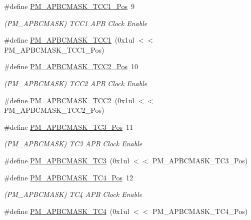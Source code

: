 \begin{DoxyCompactItemize}
\item 
\#define \mbox{\hyperlink{group___s_a_m_d21___p_m_ga7531a34e3197f854d0433f7b421681d0}{P\+M\+\_\+\+A\+P\+B\+C\+M\+A\+S\+K\+\_\+\+T\+C\+C1\+\_\+\+Pos}}~9
\begin{DoxyCompactList}\small\item\em (P\+M\+\_\+\+A\+P\+B\+C\+M\+A\+SK) T\+C\+C1 A\+PB Clock Enable \end{DoxyCompactList}\item 
\#define \mbox{\hyperlink{group___s_a_m_d21___p_m_gafb487299adc11d02aa2236c6ae39c7e8}{P\+M\+\_\+\+A\+P\+B\+C\+M\+A\+S\+K\+\_\+\+T\+C\+C1}}~(0x1ul $<$$<$ P\+M\+\_\+\+A\+P\+B\+C\+M\+A\+S\+K\+\_\+\+T\+C\+C1\+\_\+\+Pos)
\item 
\#define \mbox{\hyperlink{group___s_a_m_d21___p_m_ga6a6521e9b851e2d64fad2ad87dcf7e70}{P\+M\+\_\+\+A\+P\+B\+C\+M\+A\+S\+K\+\_\+\+T\+C\+C2\+\_\+\+Pos}}~10
\begin{DoxyCompactList}\small\item\em (P\+M\+\_\+\+A\+P\+B\+C\+M\+A\+SK) T\+C\+C2 A\+PB Clock Enable \end{DoxyCompactList}\item 
\#define \mbox{\hyperlink{group___s_a_m_d21___p_m_ga4bb882b5fec1ab879c8eade3da099ebc}{P\+M\+\_\+\+A\+P\+B\+C\+M\+A\+S\+K\+\_\+\+T\+C\+C2}}~(0x1ul $<$$<$ P\+M\+\_\+\+A\+P\+B\+C\+M\+A\+S\+K\+\_\+\+T\+C\+C2\+\_\+\+Pos)
\item 
\#define \mbox{\hyperlink{group___s_a_m_d21___p_m_ga090ad1f9cb1c7cee311d1c02054b0d82}{P\+M\+\_\+\+A\+P\+B\+C\+M\+A\+S\+K\+\_\+\+T\+C3\+\_\+\+Pos}}~11
\begin{DoxyCompactList}\small\item\em (P\+M\+\_\+\+A\+P\+B\+C\+M\+A\+SK) T\+C3 A\+PB Clock Enable \end{DoxyCompactList}\item 
\#define \mbox{\hyperlink{group___s_a_m_d21___p_m_ga6f978b468556a04cc24ddb56ec619784}{P\+M\+\_\+\+A\+P\+B\+C\+M\+A\+S\+K\+\_\+\+T\+C3}}~(0x1ul $<$$<$ P\+M\+\_\+\+A\+P\+B\+C\+M\+A\+S\+K\+\_\+\+T\+C3\+\_\+\+Pos)
\item 
\#define \mbox{\hyperlink{group___s_a_m_d21___p_m_gaca2b64857db290b39cf6ce7cb6637b72}{P\+M\+\_\+\+A\+P\+B\+C\+M\+A\+S\+K\+\_\+\+T\+C4\+\_\+\+Pos}}~12
\begin{DoxyCompactList}\small\item\em (P\+M\+\_\+\+A\+P\+B\+C\+M\+A\+SK) T\+C4 A\+PB Clock Enable \end{DoxyCompactList}\item 
\#define \mbox{\hyperlink{group___s_a_m_d21___p_m_ga4040453532b6791121651c4bfab099cd}{P\+M\+\_\+\+A\+P\+B\+C\+M\+A\+S\+K\+\_\+\+T\+C4}}~(0x1ul $<$$<$ P\+M\+\_\+\+A\+P\+B\+C\+M\+A\+S\+K\+\_\+\+T\+C4\+\_\+\+Pos)

\end{DoxyCompactItemize}
